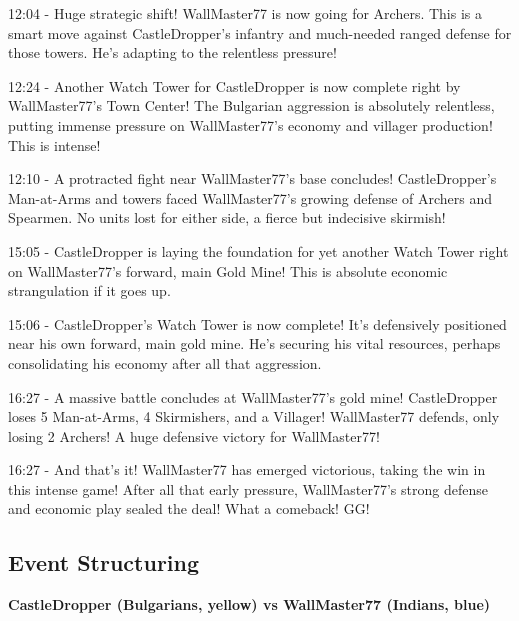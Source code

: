 12:04 - Huge strategic shift! WallMaster77 is now going for Archers. This is a smart move against CastleDropper's infantry and much-needed ranged defense for those towers. He's adapting to the relentless pressure! \par \vspace{1em}

12:24 - Another Watch Tower for CastleDropper is now complete right by WallMaster77's Town Center! The Bulgarian aggression is absolutely relentless, putting immense pressure on WallMaster77's economy and villager production! This is intense! \par \vspace{1em}

12:10 - A protracted fight near WallMaster77's base concludes! CastleDropper's Man-at-Arms and towers faced WallMaster77's growing defense of Archers and Spearmen. No units lost for either side, a fierce but indecisive skirmish! \par \vspace{1em}

15:05 - CastleDropper is laying the foundation for yet another Watch Tower right on WallMaster77's forward, main Gold Mine! This is absolute economic strangulation if it goes up. \par \vspace{1em}

15:06 - CastleDropper's Watch Tower is now complete! It's defensively positioned near his own forward, main gold mine. He's securing his vital resources, perhaps consolidating his economy after all that aggression. \par \vspace{1em}

16:27 - A massive battle concludes at WallMaster77's gold mine! CastleDropper loses 5 Man-at-Arms, 4 Skirmishers, and a Villager! WallMaster77 defends, only losing 2 Archers! A huge defensive victory for WallMaster77! \par \vspace{1em}

16:27 - And that's it! WallMaster77 has emerged victorious, taking the win in this intense game! After all that early pressure, WallMaster77's strong defense and economic play sealed the deal! What a comeback! GG! \par \vspace{1em}

\subsection{Event Structuring}
\textbf{CastleDropper (Bulgarians, yellow) vs WallMaster77 (Indians, blue)}

